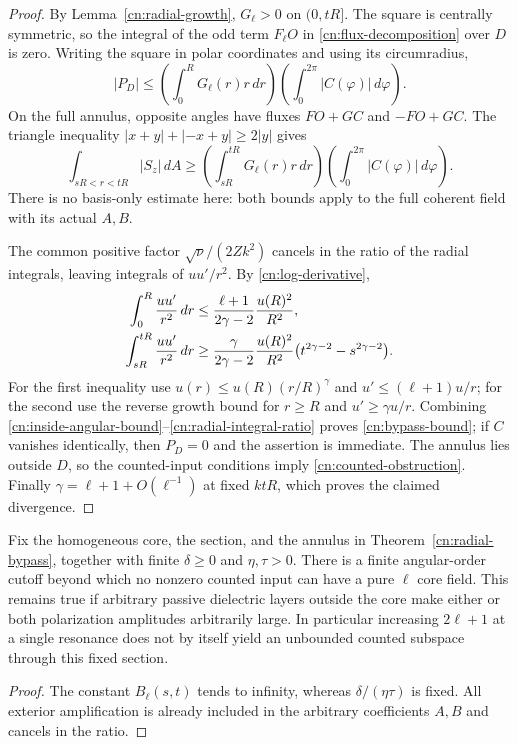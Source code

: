 \begin{proof}
By Lemma~\ref{cn:radial-growth}, $G_\ell>0$ on $(0,tR]$.
The square is centrally symmetric, so the integral of the odd term
$F_\ell O$ in \eqref{cn:flux-decomposition} over $D$ is zero.
Writing the square in polar coordinates and using its circumradius,
\begin{equation}\label{cn:inside-angular-bound}
 |P_D|\leq
 \left(\int_0^R G_\ell(r)r\,dr\right)
 \left(\int_0^{2\pi}|C(\varphi)|\,d\varphi\right).
\end{equation}
On the full annulus, opposite angles have fluxes $FO+GC$ and
$-FO+GC$.  The triangle inequality
$|x+y|+|-x+y|\geq2|y|$ gives
\begin{equation}\label{cn:outside-angular-bound}
 \int_{sR<r<tR}|S_z|\,dA\geq
 \left(\int_{sR}^{tR}G_\ell(r)r\,dr\right)
 \left(\int_0^{2\pi}|C(\varphi)|\,d\varphi\right).
\end{equation}
There is no basis-only estimate here: both bounds apply to the full
coherent field with its actual $A,B$.

The common positive factor $\sqrt\nu/(2Zk^2)$ cancels in the ratio
of the radial integrals, leaving integrals of $u u'/r^2$.
By \eqref{cn:log-derivative},
\begin{align}
 \int_0^R\frac{u u'}{r^2}\,dr
 &\leq\frac{\ell+1}{2\gamma-2}\frac{u(R)^2}{R^2},\notag\\
 \int_{sR}^{tR}\frac{u u'}{r^2}\,dr
 &\geq\frac{\gamma}{2\gamma-2}\frac{u(R)^2}{R^2}
       \bigl(t^{2\gamma-2}-s^{2\gamma-2}\bigr).
 \label{cn:radial-integral-ratio}
\end{align}
For the first inequality use
$u(r)\leq u(R)(r/R)^\gamma$ and $u'\leq(\ell+1)u/r$;
for the second use the reverse growth bound for $r\geq R$ and
$u'\geq\gamma u/r$.  Combining
\eqref{cn:inside-angular-bound}--\eqref{cn:radial-integral-ratio}
proves \eqref{cn:bypass-bound}; if $C$ vanishes identically, then
$P_D=0$ and the assertion is immediate.  The annulus lies outside
$D$, so the counted-input conditions imply
\eqref{cn:counted-obstruction}.  Finally
$\gamma=\ell+1+O(\ell^{-1})$ at fixed $ktR$, which proves the
claimed divergence.
\end{proof}

\begin{corollary}
\label{cn:bragg-consequence}
Fix the homogeneous core, the section, and the annulus in
Theorem~\ref{cn:radial-bypass}, together with finite
$\delta\geq0$ and $\eta,\tau>0$.  There is a finite angular-order
cutoff beyond which no nonzero counted input can have a pure
$\ell$ core field.  This remains true if arbitrary passive dielectric
layers outside the core make either or both polarization amplitudes
arbitrarily large.  In particular increasing $2\ell+1$ at a single
resonance does not by itself yield an unbounded counted subspace through
this fixed section.
\end{corollary}
\begin{proof}
The constant $B_\ell(s,t)$ tends to infinity, whereas
$\delta/(\eta\tau)$ is fixed.  All exterior amplification is already
included in the arbitrary coefficients $A,B$ and cancels in the ratio.
\end{proof}

